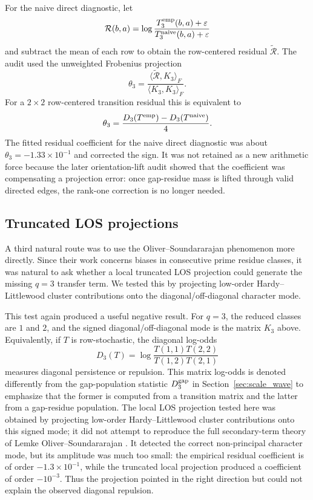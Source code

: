 \documentclass[10pt]{article}
\begin{document}
For the naive direct diagnostic, let
\[
\mathcal R(b,a)=\log\frac{T_3^{\rm emp}(b,a)+\varepsilon}{T_3^{\rm naive}(b,a)+\varepsilon}
\]
and subtract the mean of each row to obtain the row-centered residual $\widetilde{\mathcal R}$.  The audit used the unweighted Frobenius projection
\[
\theta_3=\frac{\langle \widetilde{\mathcal R},K_3\rangle_F}{\langle K_3,K_3\rangle_F}.
\]
For a $2\times2$ row-centered transition residual this is equivalent to
\[
\theta_3=\frac{D_3(T^{\rm emp})-D_3(T^{\rm naive})}{4}.
\]
The fitted residual coefficient for the naive direct diagnostic was about $\theta_3=-1.33\times10^{-1}$ and corrected the sign.  It was not retained as a new arithmetic force because the later orientation-lift audit showed that the coefficient was compensating a projection error: once gap-residue mass is lifted through valid directed edges, the rank-one correction is no longer needed.

\subsection{Truncated LOS projections}
A third natural route was to use the Oliver--Soundararajan phenomenon more directly.  Since their work concerns biases in consecutive prime residue classes, it was natural to ask whether a local truncated LOS projection could generate the missing $q=3$ transfer term.  We tested this by projecting low-order Hardy--Littlewood cluster contributions onto the diagonal/off-diagonal character mode.

This test again produced a useful negative result.  For $q=3$, the reduced classes are $1$ and $2$, and the signed diagonal/off-diagonal mode is the matrix $K_3$ above.  Equivalently, if $T$ is row-stochastic, the diagonal log-odds
\[
D_3(T)=\log\frac{T(1,1)T(2,2)}{T(1,2)T(2,1)}
\]
measures diagonal persistence or repulsion.  This matrix log-odds is denoted differently from the gap-population statistic $D_3^{\rm gap}$ in Section~\ref{sec:scale_wave} to emphasize that the former is computed from a transition matrix and the latter from a gap-residue population.  The local LOS projection tested here was obtained by projecting low-order Hardy--Littlewood cluster contributions onto this signed mode; it did not attempt to reproduce the full secondary-term theory of Lemke Oliver--Soundararajan \cite{lemke-sound-secondary}.  It detected the correct non-principal character mode, but its amplitude was much too small: the empirical residual coefficient is of order $-1.3\times10^{-1}$, while the truncated local projection produced a coefficient of order $-10^{-3}$.  Thus the projection pointed in the right direction but could not explain the observed diagonal repulsion.
\end{document}
